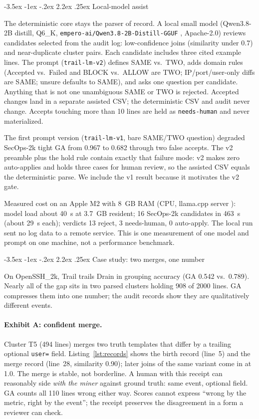 \documentclass[11pt]{article}
\makeatletter
\renewcommand\section{\@startsection{section}{1}{\z@}%
  {-3.5ex \@plus -1ex \@minus -.2ex}%
  {2.2ex \@plus .25ex}%
  {\normalfont\Large\bfseries}}
\makeatother
\begin{document}
\section{Local-model assist}
\label{sec:assist}

The deterministic core stays the parser of record. A local small model
(Qwen3.8-2B distill, Q6\_K, \texttt{empero-ai/Qwen3.8-2B-Distill-GGUF}
\cite{qwen-gguf}, Apache-2.0) reviews candidates selected from the audit log:
low-confidence joins (similarity under 0.7) and near-duplicate cluster
pairs. Each candidate includes three cited example lines. The prompt
(\texttt{trail-lm-v2}) defines SAME vs.\ TWO, adds domain rules
(Accepted vs.\ Failed and BLOCK vs.\ ALLOW are TWO; IP/port/user-only
diffs are SAME; unsure defaults to SAME), and asks one question per
candidate. Anything that is not one unambiguous SAME or TWO is
rejected. Accepted changes land in a separate assisted CSV; the
deterministic CSV and audit never change. Accepts touching more than
10 lines are held as \texttt{needs-human} and never materialized.

The first prompt version (\texttt{trail-lm-v1}, bare SAME/TWO question)
degraded SecOps-2k tight GA from 0.967 to 0.682 through two false
accepts. The v2 preamble plus the hold rule contain exactly that
failure mode: v2 makes zero auto-applies and holds three cases for
human review, so the assisted CSV equals the deterministic parse. We
include the v1 result because it motivates the v2 gate.

Measured cost on an Apple M2 with 8~GB RAM (CPU, llama.cpp server
\cite{llamacpp}):
model load about 40~s at 3.7~GB resident; 16 SecOps-2k candidates in
463~s (about 29~s each); verdicts 13 reject, 3 needs-human, 0
auto-apply. The local run sent no log data to a remote service. This
is one measurement of one model and prompt on one machine, not a
performance benchmark.

\section{Case study: two merges, one number}
\label{sec:case}

On OpenSSH\_2k, Trail trails Drain in grouping accuracy (GA 0.542 vs.\
0.789). Nearly all of the gap sits in two parsed clusters holding 908
of 2000 lines. GA compresses them into one number; the audit records
show they are qualitatively different events.

\paragraph{Exhibit A: confident merge.} Cluster T5 (494 lines) merges
two truth templates that differ by a trailing optional \texttt{user=}
field. Listing~\ref{lst:records} shows the birth record (line~5) and
the merge record (line~28, similarity 0.90); later joins of the same
variant come in at 1.0. The merge is stable, not borderline. A human
with this receipt can reasonably side \emph{with the miner} against
ground truth: same event, optional field. GA counts all 110 lines
wrong either way. Scores cannot express ``wrong by the metric, right
by the event''; the receipt preserves the disagreement in a form a
reviewer can check.
\end{document}
